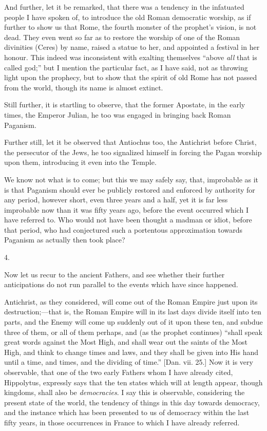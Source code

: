 And further, let it be remarked, that there was a tendency in the
infatuated people I have spoken of, to introduce the old Roman
democratic worship, as if further to show us that Rome, the fourth
monster of the prophet's vision, is not dead. They even went so far as
to restore the worship of one of the Roman divinities (Ceres) by name,
raised a statue to her, and appointed a festival in her honour. This
indeed was inconsistent with exalting themselves ``above \emph{all}
that is called god;'' but I mention the particular fact, as I have
said, not as throwing light upon the prophecy, but to show that the
spirit of old Rome has not passed from the world, though its name is
almost extinct.

Still further, it is startling to observe, that the former
Apostate, in the early times, the Emperor Julian, he too was engaged
in bringing back Roman Paganism.

Further still, let it be observed that Antiochus too, the
Antichrist before Christ, the persecutor of the Jews, he too
signalized himself in forcing the Pagan worship upon them, introducing
it even into the Temple.

We know not what is to come; but this we may safely say, that,
improbable as it is that Paganism should ever be publicly restored and
enforced by authority for any period, however short, even three years
and a half, yet it is far less improbable now than it was fifty years
ago, before the event occurred which I have referred to. Who would not
have been thought a madman or idiot, before that period, who had
conjectured such a portentous approximation towards Paganism as
actually then took place?

4.

Now let us recur to the ancient Fathers, and see whether their
further anticipations do not run parallel to the events which have
since happened.

Antichrist, as they considered, will come out of the Roman Empire
just upon its destruction;—that is, the Roman Empire will in its
last days divide itself into ten parts, and the Enemy will come up
suddenly out of it upon these ten, and subdue three of them, or all of
them perhaps, and (as the prophet continues) ``shall speak great
words against the Most High, and shall wear out the saints of the Most
High, and think to change times and laws, and they shall be given into
His hand until a time, and times, and the dividing of time.''
[Dan. vii. 25.] Now it is very observable, that one of the two early
Fathers whom I have already cited, Hippolytus, expressly says that the
ten states which will at length appear, though kingdoms, shall also be
\emph{democracies}. I say this is observable, considering the present
state of the world, the tendency of things in this day towards
democracy, and the instance which has been presented to us of
democracy within the last fifty years, in those occurrences in France
to which I have already referred.

